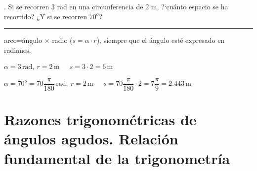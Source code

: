 \begin{miejercicio}
. Si se recorren 3 rad en una circunferencia de 2 m, ?`cuánto espacio se ha recorrido? ¿Y si se recorren $70^o$?

\rule{250pt}{0.1pt}
\vspace{5mm} 

arco=ángulo $\times$ radio ($s=\alpha \cdot r$), siempre que el ángulo esté expresado en radianes.

\vspace{2mm} $\alpha=3 \, \mathrm{rad}, \ r=2 \, \mathrm{m} \ \quad \ s=3\cdot 2 =6  \, \mathrm{m}$

\vspace{2mm} $\alpha=70^o=70 \dfrac{\pi}{180} \, \mathrm{rad}, \ r=2 \, \mathrm{m} \ \quad \ s= 70 \dfrac{\pi}{180} \cdot 2 =7\dfrac \pi 9 =2.443  \, \mathrm{m}$
	
\end{miejercicio}



\vspace{0.5cm}
\section[Razones trigonométricas de ángulos agudos. Relación fundamental de la trigonometría]{Razones trigonométricas de ángulos agudos. Relación fundamental de la trigonometría}
\vspace{0.5cm}


